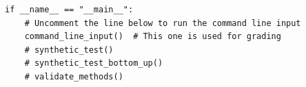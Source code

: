 \documentclass[12pt]{article}
\begin{document}
\begin{verbatim}
if __name__ == "__main__":
    # Uncomment the line below to run the command line input
    command_line_input()  # This one is used for grading
    # synthetic_test()
    # synthetic_test_bottom_up()
    # validate_methods()

\end{verbatim}
\end{document}
